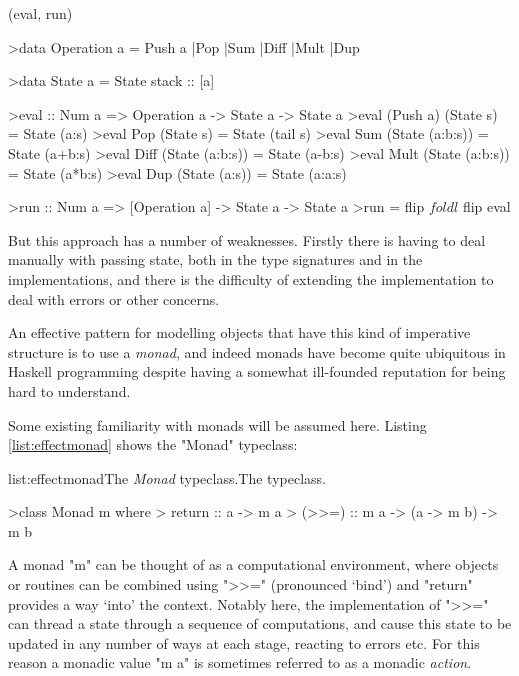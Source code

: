 \functions(eval, run)
\begin{haskell}

>data Operation a = Push a |Pop |Sum |Diff |Mult |Dup

>data State a = State {stack :: [a]}

>eval :: Num a => Operation a -> State a -> State a
>eval (Push a) (State s) = State (a:s)
>eval Pop  (State s) = State (tail s)
>eval Sum  (State (a:b:s)) = State (a+b:s)
>eval Diff (State (a:b:s)) = State (a-b:s)
>eval Mult (State (a:b:s)) = State (a*b:s)
>eval Dup  (State (a:s)) = State (a:a:s)

>run :: Num a => [Operation a] -> State a -> State a
>run = flip $ foldl $ flip eval

\end{haskell}
\noindent But this approach has a number of weaknesses. Firstly there is having to deal manually with passing state, both in the type signatures and in the implementations, and there is the difficulty of extending the implementation to deal with errors or other concerns.

An effective pattern for modelling objects that have this kind of imperative structure is to use a \emph{monad}, and indeed monads have become quite ubiquitous in Haskell programming despite having a somewhat ill-founded reputation for being hard to understand.

Some existing familiarity with monads will be assumed here. Listing \ref{list:effectmonad} shows the "Monad" typeclass:

\vspace{-0.5em}
\begin{listing}{list:effectmonad}{The \emph{Monad} typeclass.}{The  typeclass.}{}
\end{listing}\vspace{-1.5em}

\begin{haskell}

>class Monad m where
>  return :: a -> m a
>  (>>=) :: m a -> (a -> m b) -> m b

\end{haskell}
\noindent A monad "m" can be thought of as a computational environment, where objects or routines can be combined using ">>=" (pronounced `bind') and "return" provides a way `into' the context. Notably here, the implementation of ">>=" can thread a state through a sequence of computations, and cause this state to be updated in any number of ways at each stage, reacting to errors etc. For this reason a monadic value "m a" is sometimes referred to as a monadic \emph{action}.

